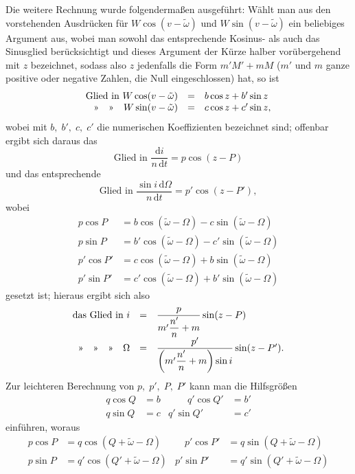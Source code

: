 \par\noindent\hspace*{\parindent}Die weitere Rechnung wurde folgendermaßen ausgeführt: Wählt man aus den vorstehenden Ausdrücken für \(W\cos(v-\tilde\omega)\) und \(W\sin(v-\tilde\omega)\) ein beliebiges Argument aus, wobei man sowohl das entsprechende Kosinus- als auch das Sinusglied berücksichtigt und dieses Argument der Kürze halber vorübergehend mit \(z\) bezeichnet, sodass also \(z\) jedenfalls die Form \(m'M'+mM\) (\(m'\) und \(m\) ganze positive oder negative Zahlen, die Null eingeschlossen) hat, so ist
\[
\begin{array}{rcl}
\text{Glied in }W\cos(v-\tilde\omega)&=&b\cos z+b'\sin z\\
\text{»\quad »\quad }W\sin(v-\tilde\omega)&=&c\cos z+c'\sin z,
\end{array}
\]
\noindent wobei mit \(b,\;b',\;c,\;c'\) die numerischen Koeffizienten bezeichnet sind; offenbar ergibt sich daraus das
\[
\text{Glied in }\frac{\mathrm{d}i}{n\,\mathrm{d}t}=p\cos(z-P)
\]
\noindent und das entsprechende
\[
\text{Glied in }\frac{\sin i\,\mathrm{d}\Omega}{n\,\mathrm{d}t}=p'\cos(z-P'),
\]
\noindent wobei
\[
\begin{aligned}
p\cos P&=b\cos(\tilde\omega-\Omega)-c\sin(\tilde\omega-\Omega)\\
p\sin P&=b'\cos(\tilde\omega-\Omega)-c'\sin(\tilde\omega-\Omega)\\
p'\cos P'&=c\cos(\tilde\omega-\Omega)+b\sin(\tilde\omega-\Omega)\\
p'\sin P'&=c'\cos(\tilde\omega-\Omega)+b'\sin(\tilde\omega-\Omega)
\end{aligned}
\]
\noindent gesetzt ist; hieraus ergibt sich also
\[
\begin{array}{rcl}
\text{das Glied in }i&=&\dfrac{p}{m'\dfrac{n'}{n}+m}\sin(z-P)\\[8pt]
\text{»\quad »\quad »\quad }\Omega&=&\dfrac{p'}{\left(m'\dfrac{n'}{n}+m\right)\sin i}\sin(z-P').
\end{array}
\]
\noindent Zur leichteren Berechnung von \(p,\;p',\;P,\;P'\) kann man die Hilfsgrößen
\[
\begin{aligned}
q\cos Q&=b&\qquad q'\cos Q'&=b'\\
q\sin Q&=c& q'\sin Q'&=c'
\end{aligned}
\]
\noindent einführen, woraus
\[
\begin{aligned}
p\cos P&=q\cos(Q+\tilde\omega-\Omega)&\quad p'\cos P'&=q\sin(Q+\tilde\omega-\Omega)\\
p\sin P&=q'\cos(Q'+\tilde\omega-\Omega)&p'\sin P'&=q'\sin(Q'+\tilde\omega-\Omega)
\end{aligned}
\]
